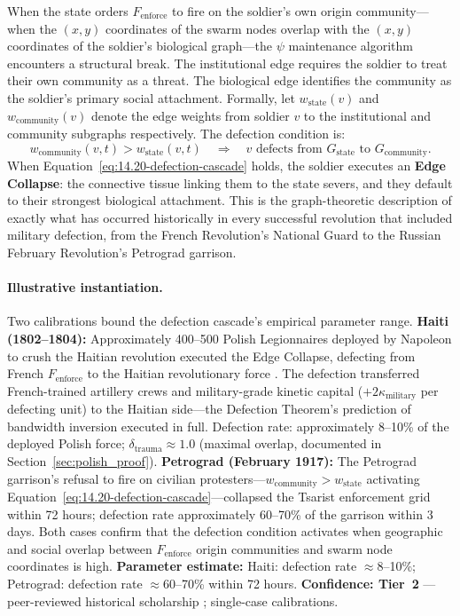 When the state orders $F_{\text{enforce}}$ to fire on the soldier's own origin community---when the $(x, y)$ coordinates of the swarm nodes overlap with the $(x,y)$ coordinates of the soldier's biological graph---the $\psi$ maintenance algorithm encounters a structural break. The institutional edge requires the soldier to treat their own community as a threat. The biological edge identifies the community as the soldier's primary social attachment. Formally, let $w_{\text{state}}(v)$ and $w_{\text{community}}(v)$ denote the edge weights from soldier $v$ to the institutional and community subgraphs respectively. The defection condition is:
\begin{equation}\label{eq:14.20-defection-cascade}
w_{\text{community}}(v, t) > w_{\text{state}}(v, t) \quad \Longrightarrow \quad v \text{ defects from } G_{\text{state}} \text{ to } G_{\text{community}}.
\end{equation}
When Equation~\eqref{eq:14.20-defection-cascade} holds, the soldier executes an \textbf{Edge Collapse}: the connective tissue linking them to the state severs, and they default to their strongest biological attachment. This is the graph-theoretic description of exactly what has occurred historically in every successful revolution that included military defection, from the French Revolution's National Guard to the Russian February Revolution's Petrograd garrison.

\paragraph{Illustrative instantiation.}
Two calibrations bound the defection cascade's empirical parameter range. \textbf{Haiti (1802--1804):} Approximately 400--500 Polish Legionnaires deployed by Napoleon to crush the Haitian revolution executed the Edge Collapse, defecting from French $F_{\text{enforce}}$ to the Haitian revolutionary force \cite{pachonski_polish_haiti}. The defection transferred French-trained artillery crews and military-grade kinetic capital ($+2\kappa_{\text{military}}$ per defecting unit) to the Haitian side---the Defection Theorem's prediction of bandwidth inversion executed in full. Defection rate: approximately 8--10\% of the deployed Polish force; $\delta_{\text{trauma}} \approx 1.0$ (maximal overlap, documented in Section~\ref{sec:polish_proof}). \textbf{Petrograd (February 1917):} The Petrograd garrison's refusal to fire on civilian protesters---$w_{\text{community}} > w_{\text{state}}$ activating Equation~\eqref{eq:14.20-defection-cascade}---collapsed the Tsarist enforcement grid within 72 hours; defection rate approximately 60--70\% of the garrison within 3 days. Both cases confirm that the defection condition activates when geographic and social overlap between $F_{\text{enforce}}$ origin communities and swarm node coordinates is high. \textbf{Parameter estimate:} Haiti: defection rate $\approx 8$--10\%; Petrograd: defection rate $\approx 60$--70\% within 72 hours. \textbf{Confidence: Tier~2} --- peer-reviewed historical scholarship \cite{pachonski_polish_haiti}; single-case calibrations.


